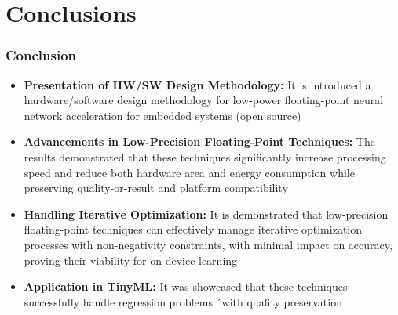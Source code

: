 \section{Conclusions}
\tableofcontents[currentsection]
\begin{frame}[t]
	\frametitle{Conclusion}
	
\begin{itemize}
	\item <1-> \textbf{Presentation of HW/SW Design Methodology:} It is introduced a hardware/software design methodology for low-power floating-point neural network acceleration for embedded systems (open source)
	
	\item<2-> \textbf{Advancements in Low-Precision Floating-Point Techniques:} The results demonstrated that these techniques significantly increase processing speed and reduce both hardware area and energy consumption while preserving quality-or-result and platform compatibility
	
	\item<3-> \textbf{Handling Iterative Optimization:} It is demonstrated that low-precision floating-point techniques can effectively manage iterative optimization processes with non-negativity constraints, with minimal impact on accuracy, proving their viability for on-device learning
	
	\item<4-> \textbf{Application in TinyML:} It was showcased that these techniques successfully handle regression problems ´with quality preservation
\end{itemize}

\end{frame}